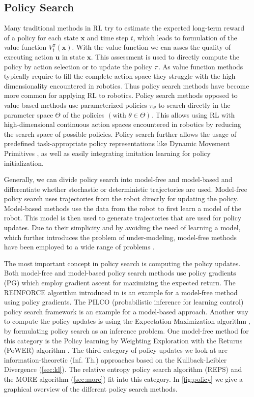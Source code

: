 \subsection{Policy Search}
Many traditional methods in RL try to estimate the
expected long-term reward of a policy for each state $\mathbf{x}$
and time step $t$, which leads to formulation of the value function $V^{\pi}_t(\mathbf{x})$.
With the value function we can asses the quality of executing action
$\mathbf{u}$ in state $\mathbf{x}$. This assessment is used
to directly compute the policy by action selection or to update
the policy $\pi$. As value function methods typically require
to fill the complete action-space they struggle with
the high dimensionality encountered in robotics.
Thus policy search methods have become more common
for applying RL to robotics.
Policy search methods opposed to value-based methods
use parameterized policies $\pi_{\theta}$ to search
directly in the parameter space $\Theta$
of the policies $(\text{with }\theta \in \Theta)$. This allows using RL with
high-dimensional continuous action spaces encountered
in robotics by reducing the search space of possible policies.
Policy search further allows the usage of predefined
task-appropriate policy representations like Dynamic
Movement Primitives \citep{schaal2005learning}, as well
as easily integrating imitation learning
for policy initialization.

Generally, we can divide policy search into model-free and model-based and
differentiate whether stochastic or deterministic trajectories are used.
Model-free policy search uses trajectories from the robot directly
for updating the policy. Model-based methods use the data
from the robot to first learn a model of the robot. This model is then used
to generate trajectories that are used for policy updates.
Due to their simplicity and by avoiding the need of learning a model,
which further introduces the problem of under-modeling,
model-free methods have been employed to a wide range of problems
\citep{deisenroth2013survey}.

The most important concept in policy search is computing the policy updates.
Both model-free and model-based policy search methods use policy
gradients (PG) which employ gradient ascent for maximizing
the expected return.
The REINFORCE algorithm introduced in \citet{williams1992simple}
is an example for a model-free method using policy gradients.
The PILCO (probabilistic inference for learning control)
policy search framework \citep{deisenroth2011pilco}
is an example for a model-based approach.
Another way to compute the policy updates 
is using the Expectation-Maximization algorithm \citep{bishop2006pattern},
by formulating policy
search as an inference problem. One model-free method for this category
is the Policy learning by Weighting Exploration with the Returns (PoWER)
algorithm \citep{kober2011policy}.
The third category of policy updates we look at
are information-theoretic (Inf. Th.) approaches
based on the Kullback-Leibler Divergence (\cref{sec:kl}).
The relative entropy policy search algorithm (REPS)
\citep{peters2010relative}
and the MORE algorithm (\cref{sec:more}) fit into this category.
In \cref{fig:policy}
we give a graphical overview of the different policy search methods.

